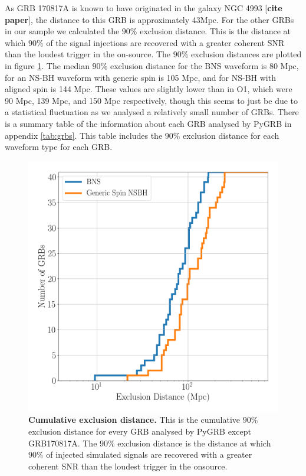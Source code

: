 \documentclass[11pt]{cuthesis}
\begin{document}
As GRB 170817A is known to have originated in the galaxy NGC 4993 [\textbf{cite paper}], the distance to this GRB is approximately 43Mpc. For the other GRBs in our sample we calculated the $90\%$ exclusion distance. This is the distance at which $90\%$ of the signal injections are recovered with a greater coherent SNR than the loudest trigger in the on-source. The $90\%$ exclusion distances are plotted in figure \ref{fig:ex dist}. The median $90\%$ exclusion distance for the BNS waveform is 80 Mpc, for an NS-BH waveform with generic spin is 105 Mpc, and for NS-BH with aligned spin is 144 Mpc. These values are slightly lower than in O1, which were 90 Mpc, 139 Mpc, and 150 Mpc respectively, though this seems to just be due to a statistical fluctuation as we analysed a relatively small number of GRBs. There is a summary table of the information about each GRB analysed by PyGRB in appendix \ref{tab:grbs}. This table includes the $90\%$ exclusion distance for each waveform type for each GRB.

\begin{figure}
\begin{center}
\includegraphics[width=0.8\linewidth]{pygrb_exclusion_distance.png}
\end{center}
\caption{\textbf{Cumulative exclusion distance.} This is the cumulative $90\%$ exclusion distance for every GRB analysed by PyGRB except GRB170817A.  The $90\%$ exclusion distance is the distance at which $90\%$ of injected simulated signals are recovered with a greater coherent SNR than the loudest trigger in the onsource. }
\label{fig:ex dist}
\end{figure}
\end{document}

